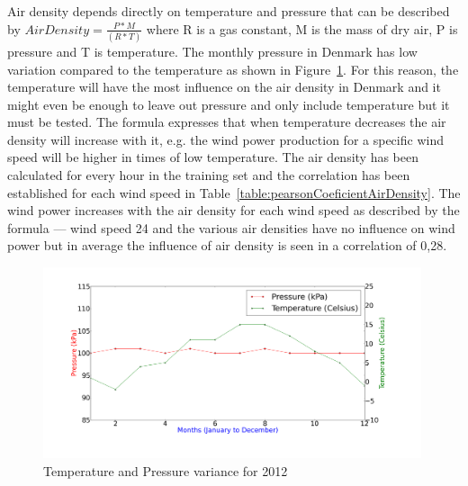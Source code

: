 Air density depends directly on temperature and pressure that can be described by $Air Density=\frac{P*M}{(R*T)}$ where R is a gas constant, M is the mass of dry air, P is pressure and T is temperature. The monthly pressure in Denmark has low variation compared to the temperature as shown in Figure~\ref{fig:pressureTemperatureVariance}. For this reason, the temperature will have the most influence on the air density in Denmark and it might even be enough to leave out pressure and only include temperature but it must be tested. The formula expresses that when temperature decreases the air density will increase with it, e.g. the wind power production for a specific wind speed will be higher in times of low temperature. The air density has been calculated for every hour in the training set and the correlation has been established for each wind speed in Table~\ref{table:pearsonCoeficientAirDensity}. The wind power increases with the air density for each wind speed as described by the formula --- wind speed 24 and the various air densities have no influence on wind power but in average the influence of air density is seen in a correlation of 0,28.

\begin{figure}[h!]
\centering
\includegraphics[width=0.99\textwidth]{billeder/pressureTemperatureVariance.png}
\caption{Temperature and Pressure variance for 2012}
\label{fig:pressureTemperatureVariance}
\end{figure}

